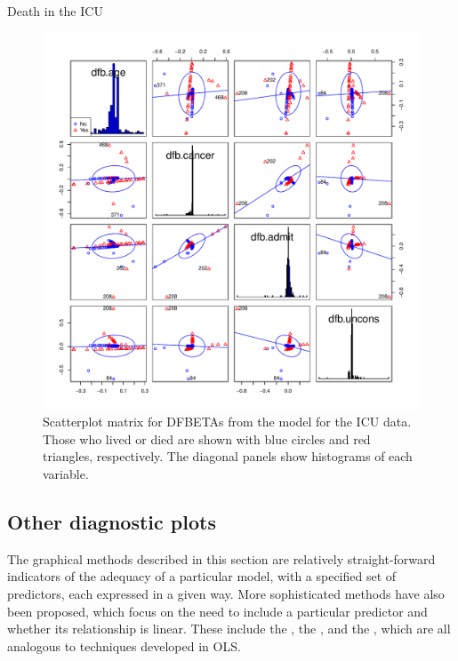 \documentclass[11pt]{book}
\renewenvironment{knitrout}{\small\renewcommand{\baselinestretch}{.85}}{} %
\begin{document}
\begin{Example}[icu2]{Death in the ICU}
\begin{knitrout}
\begin{figure}[!htbp]
\centerline{\includegraphics[width=.9\textwidth]{ch07/fig/icu2-dbscatmat} }

\caption[Scatterplot matrix for DFBETAs from the model for the ICU data]{Scatterplot matrix for DFBETAs from the model for the ICU data. Those who lived or died are shown with blue circles and red triangles, respectively. The diagonal panels show histograms of each variable.\label{fig:icu2-dbscatmat}}
\end{figure}


\end{knitrout}


\end{Example}

\subsection{Other diagnostic plots}\label{sec:logist-partial}

The graphical methods described in this section are relatively
straight-forward indicators of the adequacy of a particular model,
with a specified set of predictors, each expressed in a given way.
More sophisticated methods have also been proposed, which focus on the need to include a particular predictor and whether its relationship is linear.
These include the , the
, and the
,
which are all analogous to techniques developed in OLS.
\end{document}
